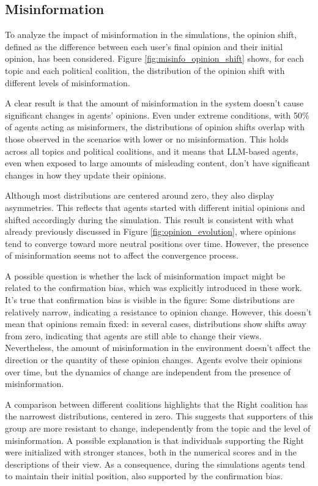 \subsection{Misinformation}
To analyze the impact of misinformation in the simulations, the opinion shift, defined as the difference between each user's final opinion and their initial opinion, has been considered.
Figure \ref{fig:misinfo_opinion_shift} shows, for each topic and each political coalition, the distribution of the opinion shift with different levels of misinformation.

A clear result is that the amount of misinformation in the system doesn't cause significant changes in agents' opinions.
Even under extreme conditions, with 50\% of agents acting as misinformers, the distributions of opinion shifts overlap with those observed in the scenarios with lower or no misinformation.
This holds across all topics and political coalitions, and it means that LLM-based agents, even when exposed to large amounts of misleading content, don't have significant changes in how they update their opinions.

Although most distributions are centered around zero, they also display asymmetries.
This reflects that agents started with different initial opinions and shifted accordingly during the simulation.
This result is consistent with what already previously discussed in Figure \ref{fig:opinion_evolution}, where opinions tend to converge toward more neutral positions over time.
However, the presence of misinformation seems not to affect the convergence process.

A possible question is whether the lack of misinformation impact might be related to the confirmation bias, which was explicitly introduced in these work.
It's true that confirmation bias is visible in the figure: Some distributions are relatively narrow, indicating a resistance to opinion change.
However, this doesn't mean that opinions remain fixed: in several cases, distributions show shifts away from zero, indicating that agents are still able to change their views.
Nevertheless, the amount of misinformation in the environment doesn't affect the direction or the quantity of these opinion changes. Agents evolve their opinions over time, but the dynamics of change are independent from the presence of misinformation.

A comparison between different coalitions highlights that the Right coalition has the narrowest distributions, centered in zero.
This suggests that supporters of this group are more resistant to change, independently from the topic and the level of misinformation.
A possible explanation is that individuals supporting the Right were initialized with stronger stances, both in the numerical scores and in the descriptions of their view. 
As a consequence, during the simulations agents tend to maintain their initial position, also supported by the confirmation bias.

